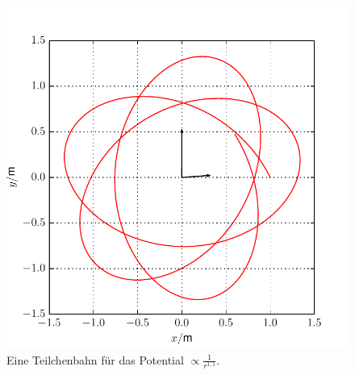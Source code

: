 \begin{figure}[H]
	\centering
	\includegraphics[width = \textwidth]{../Plots/Plot_4_E_2.pdf}
	\caption{Eine Teilchenbahn für das Potential $\propto\frac{1}{r^{1,1}}$.\label{fig:E2}}
\end{figure}